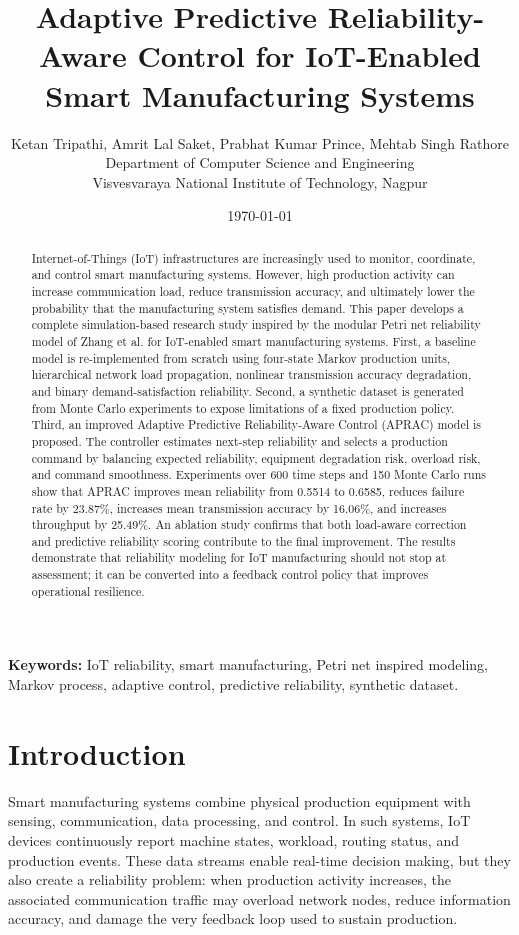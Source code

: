 \documentclass[journal]{IEEEtran}
\title{\textbf{Adaptive Predictive Reliability-Aware Control for IoT-Enabled Smart Manufacturing Systems}}
\author{Ketan Tripathi, Amrit Lal Saket, Prabhat Kumar Prince, Mehtab Singh Rathore \\

Department of Computer Science and Engineering \\

Visvesvaraya National Institute of Technology, Nagpur}
\date{\today}
\begin{document}
\sloppy
\maketitle

\begin{abstract}
Internet-of-Things (IoT) infrastructures are increasingly used to monitor, coordinate, and control smart manufacturing systems. However, high production activity can increase communication load, reduce transmission accuracy, and ultimately lower the probability that the manufacturing system satisfies demand. This paper develops a complete simulation-based research study inspired by the modular Petri net reliability model of Zhang et al. for IoT-enabled smart manufacturing systems. First, a baseline model is re-implemented from scratch using four-state Markov production units, hierarchical network load propagation, nonlinear transmission accuracy degradation, and binary demand-satisfaction reliability. Second, a synthetic dataset is generated from Monte Carlo experiments to expose limitations of a fixed production policy. Third, an improved Adaptive Predictive Reliability-Aware Control (APRAC) model is proposed. The controller estimates next-step reliability and selects a production command by balancing expected reliability, equipment degradation risk, overload risk, and command smoothness. Experiments over 600 time steps and 150 Monte Carlo runs show that APRAC improves mean reliability from 0.5514 to 0.6585, reduces failure rate by 23.87\%, increases mean transmission accuracy by 16.06\%, and increases throughput by 25.49\%. An ablation study confirms that both load-aware correction and predictive reliability scoring contribute to the final improvement. The results demonstrate that reliability modeling for IoT manufacturing should not stop at assessment; it can be converted into a feedback control policy that improves operational resilience.
\end{abstract}

\noindent\textbf{Keywords:} IoT reliability, smart manufacturing, Petri net inspired modeling, Markov process, adaptive control, predictive reliability, synthetic dataset.

\section{Introduction}

Smart manufacturing systems combine physical production equipment with sensing, communication, data processing, and control. In such systems, IoT devices continuously report machine states, workload, routing status, and production events. These data streams enable real-time decision making, but they also create a reliability problem: when production activity increases, the associated communication traffic may overload network nodes, reduce information accuracy, and damage the very feedback loop used to sustain production.
\end{document}
